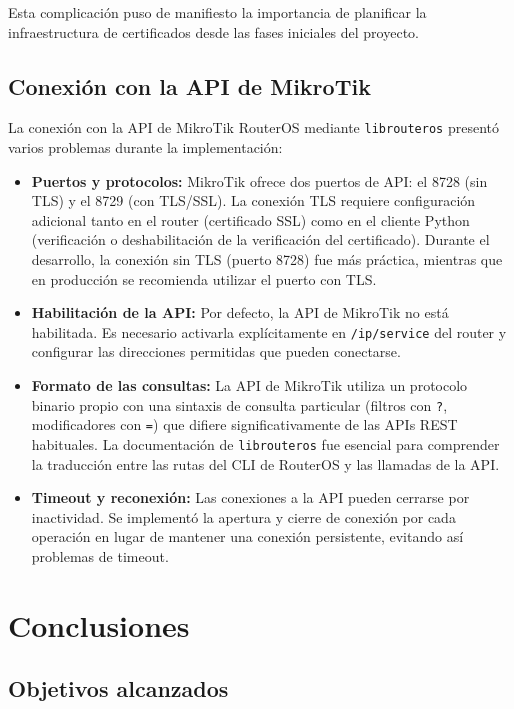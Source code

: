 \documentclass[12pt, a4paper, twoside]{article}
\begin{document}
Esta complicación puso de manifiesto la importancia de planificar la infraestructura de certificados desde las fases iniciales del proyecto.

\subsection{Conexión con la API de MikroTik}

La conexión con la API de MikroTik RouterOS mediante \texttt{librouteros} presentó varios problemas durante la implementación:

\begin{itemize}
  \item \textbf{Puertos y protocolos:} MikroTik ofrece dos puertos de API: el 8728 (sin TLS) y el 8729 (con TLS/SSL). La conexión TLS requiere configuración adicional tanto en el router (certificado SSL) como en el cliente Python (verificación o deshabilitación de la verificación del certificado). Durante el desarrollo, la conexión sin TLS (puerto 8728) fue más práctica, mientras que en producción se recomienda utilizar el puerto con TLS.
  \item \textbf{Habilitación de la API:} Por defecto, la API de MikroTik no está habilitada. Es necesario activarla explícitamente en \texttt{/ip/service} del router y configurar las direcciones permitidas que pueden conectarse.
  \item \textbf{Formato de las consultas:} La API de MikroTik utiliza un protocolo binario propio con una sintaxis de consulta particular (filtros con \texttt{?}, modificadores con \texttt{=}) que difiere significativamente de las APIs REST habituales. La documentación de \texttt{librouteros} fue esencial para comprender la traducción entre las rutas del CLI de RouterOS y las llamadas de la API.
  \item \textbf{Timeout y reconexión:} Las conexiones a la API pueden cerrarse por inactividad. Se implementó la apertura y cierre de conexión por cada operación en lugar de mantener una conexión persistente, evitando así problemas de timeout.
\end{itemize}

\section{Conclusiones}

\subsection{Objetivos alcanzados}
\end{document}
